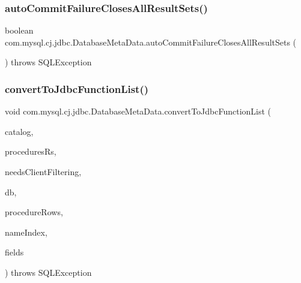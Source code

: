 \subsubsection{\texorpdfstring{auto\+Commit\+Failure\+Closes\+All\+Result\+Sets()}{autoCommitFailureClosesAllResultSets()}}
{\footnotesize\ttfamily boolean com.\+mysql.\+cj.\+jdbc.\+Database\+Meta\+Data.\+auto\+Commit\+Failure\+Closes\+All\+Result\+Sets (\begin{DoxyParamCaption}{ }\end{DoxyParamCaption}) throws S\+Q\+L\+Exception}

\mbox{\label{classcom_1_1mysql_1_1cj_1_1jdbc_1_1_database_meta_data_a23ca9ddec13a2fa4cc61de50318d425a}} 
\subsubsection{\texorpdfstring{convert\+To\+Jdbc\+Function\+List()}{convertToJdbcFunctionList()}}
{\footnotesize\ttfamily void com.\+mysql.\+cj.\+jdbc.\+Database\+Meta\+Data.\+convert\+To\+Jdbc\+Function\+List (\begin{DoxyParamCaption}\item[{String}]{catalog,  }\item[{Result\+Set}]{procedures\+Rs,  }\item[{boolean}]{needs\+Client\+Filtering,  }\item[{String}]{db,  }\item[{List$<$ \mbox{\hyperlink{classcom_1_1mysql_1_1cj_1_1jdbc_1_1_database_meta_data_1_1_comparable_wrapper}{Comparable\+Wrapper}}$<$ String, \mbox{\hyperlink{interfacecom_1_1mysql_1_1cj_1_1result_1_1_row}{Row}} $>$$>$}]{procedure\+Rows,  }\item[{int}]{name\+Index,  }\item[{\mbox{\hyperlink{classcom_1_1mysql_1_1cj_1_1result_1_1_field}{Field}} \mbox{[}$\,$\mbox{]}}]{fields }\end{DoxyParamCaption}) throws S\+Q\+L\+Exception\hspace{0.3cm}{\ttfamily [protected]}}


